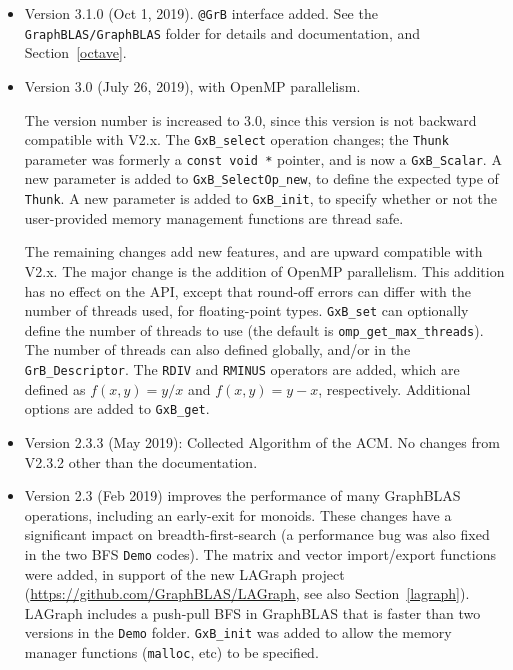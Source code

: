 \begin{itemize}
    \verb'@GrB' interface modified:  \verb'GrB.init' is now required.

\item Version 3.1.0 (Oct 1, 2019).  \verb'@GrB' interface added.  See the
    \newline \verb'GraphBLAS/GraphBLAS' folder for details and documentation,
    and Section~\ref{octave}.

\item Version 3.0 (July 26, 2019), with OpenMP parallelism.

The version number is increased to 3.0, since
this version is not backward compatible with V2.x.  The \verb'GxB_select'
operation changes; the \verb'Thunk' parameter was formerly a
\verb'const void *' pointer, and is now a \verb'GxB_Scalar'.  A new parameter
is added to \verb'GxB_SelectOp_new', to define the expected type of
\verb'Thunk'.  A new parameter is added to \verb'GxB_init', to specify whether
or not the user-provided memory management functions are thread safe.

The remaining changes add new features, and are upward compatible with V2.x.
The major change is the addition of OpenMP parallelism.  This addition has no
effect on the API, except that round-off errors can differ with the number of
threads used, for floating-point types.  \verb'GxB_set' can optionally define
the number of threads to use (the default is \verb'omp_get_max_threads').  The
number of threads can also defined globally, and/or in the
\verb'GrB_Descriptor'.  The \verb'RDIV' and \verb'RMINUS' operators are added,
which are defined as $f(x,y)=y/x$ and $f(x,y)=y-x$, respectively.  Additional
options are added to \verb'GxB_get'.

\item Version 2.3.3 (May 2019): Collected Algorithm of the ACM.
No changes from V2.3.2 other than the documentation.

\item Version 2.3 (Feb 2019) improves the performance of many GraphBLAS
operations, including an early-exit for monoids.  These changes have a
significant impact on breadth-first-search (a performance bug was also fixed in
the two BFS \verb'Demo' codes).  The matrix and vector import/export functions
were added, in support of the new LAGraph project
(\url{https://github.com/GraphBLAS/LAGraph}, see also Section~\ref{lagraph}).
LAGraph includes a push-pull BFS in GraphBLAS that is faster than two versions
in the \verb'Demo' folder.  \verb'GxB_init' was added to allow the memory
manager functions (\verb'malloc', etc) to be specified.


\end{itemize}
